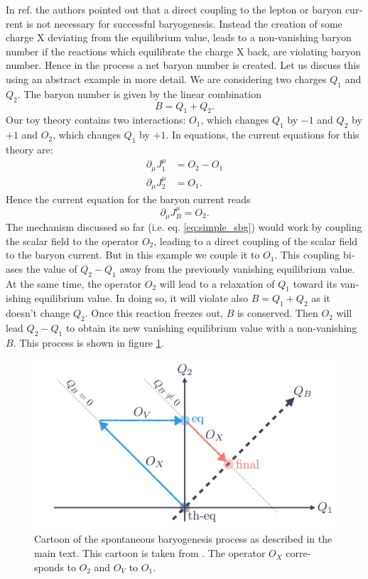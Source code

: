 \documentclass[master,       %
               twoside,        %
               BCOR10mm,       %
               english,ngerman, %
               ]{GAUBM}
\begin{document}
\begin{otherlanguage}{english}
In ref. \cite{Domcke:2020kcp_Generic_Couplings} the authors pointed out that a direct coupling to the lepton or baryon current is not necessary for successful baryogenesis.
Instead the creation of some charge X deviating from the equilibrium value, leads to a non-vanishing baryon number if the reactions which equilibrate the charge X back, are violating baryon number. Hence in the process a net baryon number is created.
Let us discuss this using an abstract example in more detail.
We are considering two charges $Q_1$ and $Q_2$. The baryon number is given by the linear combination
\begin{equation}
	B = Q_1 + Q_2.
\end{equation}
Our toy theory contains two interactions: $O_1$, which changes $Q_1$ by $-1$ and $Q_2$ by $+1$ and $O_2$, which changes $Q_1$ by $+1$. In equations, the current equations for this theory are:
\begin{align}
	\partial_\mu J_1^\mu &= O_2 - O_1 \\
	\partial_\mu J_2^\mu &= O_1 \nonumber.
\end{align}
Hence the current equation for the baryon current reads
\begin{equation}
	\partial_\mu J_B^\mu = O_2.
\end{equation}
The mechanism discussed so far (i.e. eq. \eqref{eq:simple_sbg}) would work by coupling the scalar field to the operator $O_2$, leading to a direct coupling of the scalar field to the baryon current. But in this example we couple it to $O_1$.
This coupling biases the value of $Q_2 - Q_1$ away from the previously vanishing equilibrium value.
At the same time, the operator $O_2$ will lead to a relaxation of $Q_1$ toward its vanishing equilibrium value. In doing so, it will violate also $B = Q_1 + Q_2$ as it doesn't change $Q_2$. Once this reaction freezes out, $B$ is conserved. Then $O_2$ will lead $Q_2 - Q_1$ to obtain its new vanishing equilibrium value with a non-vanishing $B$.
This process is shown in figure \ref{fig:sbg_cartoon}.
\begin{figure}[H]
	\centering
	\includegraphics[width=\linewidth]{figures/sbg_cartoon.pdf}
	\caption{Cartoon of the spontaneous baryogenesis process as described in the main text. This cartoon is taken from \cite[fig. 1]{Domcke:2020kcp_Generic_Couplings}.
	The operator $O_X$ corresponds to $O_2$ and $O_V$ to $O_1$.
	}
	\label{fig:sbg_cartoon}
\end{figure}


\end{otherlanguage}
\end{document}
